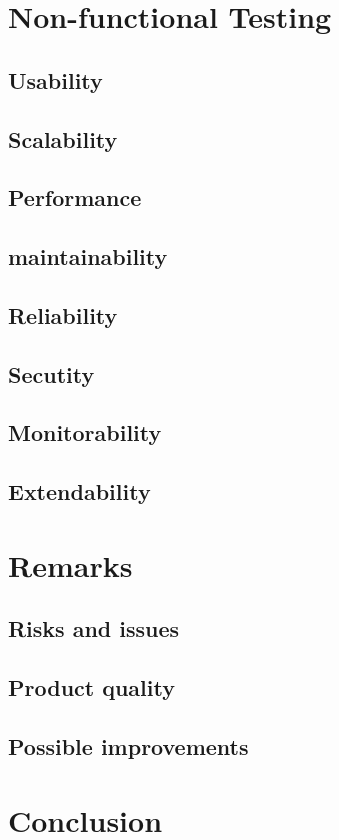 \documentclass[a4paper,12pt,titlepage]{article}
\begin{document}
	
\section{Non-functional Testing}
	\subsection{Usability}
	
	
	\subsection{Scalability}
	
	
	\subsection{Performance}
	
	
	\subsection{maintainability}
	
	
	\subsection{Reliability}
	
	
	\subsection{Secutity}
	
	
	\subsection{Monitorability}
	
	
	\subsection{Extendability}
	
	
\section{Remarks}
	\subsection{Risks and issues}
	
	
	\subsection{Product quality}
	 
	
	\subsection{Possible improvements}
	

\section{Conclusion}
	
\end{document}
